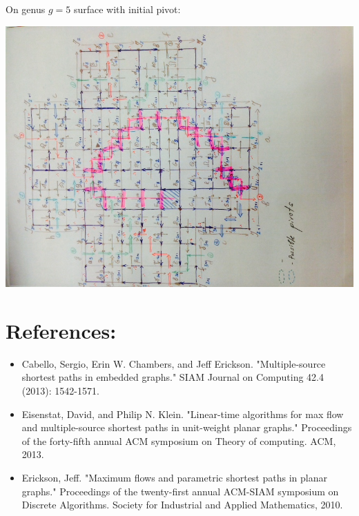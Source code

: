 \documentclass{article}
\begin{document}
On genus $g = 5$ surface with initial pivot:
\begin{center}
\includegraphics[angle = -90, scale = 0.7]{genus4_after5Pivots.jpg}
\end{center}
\newpage

\section{References:}
\begin{itemize}
\item Cabello, Sergio, Erin W. Chambers, and Jeff Erickson. "Multiple-source shortest paths in embedded graphs." SIAM Journal on Computing 42.4 (2013): 1542-1571.
\item Eisenstat, David, and Philip N. Klein. "Linear-time algorithms for max flow and multiple-source shortest paths in unit-weight planar graphs." Proceedings of the forty-fifth annual ACM symposium on Theory of computing. ACM, 2013.
\item Erickson, Jeff. "Maximum flows and parametric shortest paths in planar graphs." Proceedings of the twenty-first annual ACM-SIAM symposium on Discrete Algorithms. Society for Industrial and Applied Mathematics, 2010.
\end{itemize}
\end{document}

